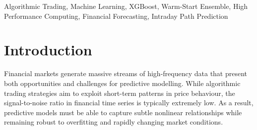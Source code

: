 \documentclass[conference]{IEEEtran}
\begin{document}
\begin{abstract}
The primary contribution of this work is the development of a scalable end-to-end modelling workflow that integrates financial data infrastructure with GPU-accelerated machine learning for continuous retraining of predictive trading models. The deployed base model uses 400 boosted trees trained with a fast-refresh profile optimized for operational retraining speed. A warm-refresh simulation on 2026-04-07 demonstrates that the base model can be augmented with 30 fresh trees at each of 26 intraday time steps---growing the ensemble from 400 to 1{,}180 trees---across all 504 symbols in under 7~seconds per step on an H100 GPU, with the entire 26-step simulation completing in approximately 9~minutes of wall time. Prediction analysis across the simulation steps shows that the model adapts its directional forecasts as new intraday data arrives, with the proportion of bearish forecasts increasing from 55\% at market open to 63\% by session close on the evaluation date. The resulting pipeline supports automated daily retraining and delivers predicted return paths through a business-intelligence dashboard for downstream analysis.
\end{abstract}

\begin{IEEEkeywords}
Algorithmic Trading, Machine Learning, XGBoost, Warm-Start Ensemble, High Performance Computing, Financial Forecasting, Intraday Path Prediction
\end{IEEEkeywords}

\section{Introduction}

Financial markets generate massive streams of high-frequency data that present both opportunities and challenges for predictive modelling. While algorithmic trading strategies aim to exploit short-term patterns in price behaviour, the signal-to-noise ratio in financial time series is typically extremely low. As a result, predictive models must be able to capture subtle nonlinear relationships while remaining robust to overfitting and rapidly changing market conditions.
\end{document}
